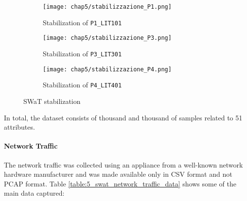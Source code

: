 \begin{figure}[ht]
	\centering
	\begin{subfigure}{0.48\textwidth}
		\texttt{[image: chap5/stabilizzazione\_P1.png]}
		\caption{Stabilization of \texttt{P1\_LIT101}}
		\label{subfig:5_stab_lit101}
	\end{subfigure}
	\hfill
	\begin{subfigure}{0.48\textwidth}
		\texttt{[image: chap5/stabilizzazione\_P3.png]}
		\caption{Stabilization of \texttt{P3\_LIT301}}
		\label{subfig:5_stab_lit301}
	\end{subfigure}
	\begin{subfigure}{0.48\textwidth}
		\texttt{[image: chap5/stabilizzazione\_P4.png]}
		\caption{Stabilization of \texttt{P4\_LIT401}}
		\label{subfig:5_stab_lit401}
	\end{subfigure}
	\caption{SWaT stabilization}
	\label{fig:5_swat_stabilization}
\end{figure}
In total, the dataset consists of thousand and thousand of samples related to 51 attributes.

\paragraph{Network Traffic}
The network traffic was collected using an appliance from a well-known network hardware manufacturer and was made available only in CSV format and not PCAP format. Table \ref{table:5_swat_network_traffic_data} shows some of the main data captured:

